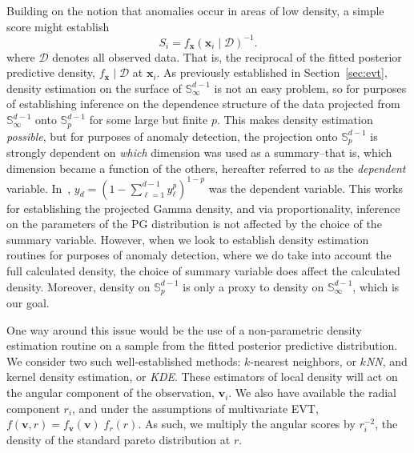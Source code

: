 Building on the notion that anomalies occur in areas of low density, a simple
  score might establish
  \[
      S_i = f_{\bm{x}}(\bm{x}_i\mid \mathcal{D})^{-1}.  
  \]  
  where $\mathcal{D}$ denotes all observed data.  That is, the reciprocal of the 
  fitted posterior predictive density, $f_{\bm{x}}\mid \mathcal{D}$ at $\bm{x}_i$.
  As previously established in Section~\ref{sec:evt}, density estimation on the 
  surface of ${\mathbb S}_{\infty}^{d-1}$ is not an easy problem, so for 
  purposes of establishing inference on the dependence structure of the data 
  projected from ${\mathbb S}_{\infty}^{d-1}$ onto ${\mathbb S}_p^{d-1}$ for 
  some large but finite $p$.  This makes density estimation \emph{possible}, but 
  for purposes of anomaly detection, the projection onto ${\mathbb S}_p^{d-1}$ is 
  strongly dependent on \emph{which} dimension was used as a summary--that is, 
  which dimension became a function of the others, hereafter referred to as the 
  \emph{dependent} variable. In~\cite{trubey:pg}, 
  $y_d = (1 - \sum_{\ell = 1}^{d-1}y_{\ell}^p)^{1-p}$ was the dependent variable.
  This works for establishing the projected Gamma density, and via 
  proportionality, inference on the parameters of the PG distribution is not affected
  by the choice of the summary variable. However, when we look to establish 
  density estimation routines for purposes of anomaly detection, where we do 
  take into account the full calculated density, the choice of summary variable 
  does affect the calculated density.  Moreover, density on $\mathbb{S}_p^{d-1}$
  is only a proxy to density on $\mathbb{S}_{\infty}^{d-1}$, which is our goal.


One way around this issue would be the use of a non-parametric density estimation
  routine on a sample from the fitted posterior predictive distribution.  
  We consider two such well-established methods: 
  $k$-nearest neighbors, or \emph{$k$NN}, 
  and kernel density estimation, or \emph{KDE}.
  These estimators of local density will act on the angular component of the observation,
  $\bm{v}_i$.  We also have available the radial component $r_i$, and under the
  assumptions of multivariate EVT, $f(\bm{v},r) = f_{\bm{v}}(\bm{v})\;f_{r}(r)$.  As such,
  we multiply the angular scores by $r_i^{-2}$, the density of the standard pareto
  distribution at $r$.

